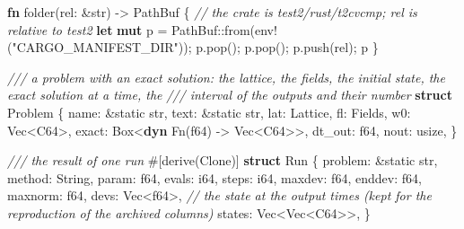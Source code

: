 \documentclass[
  10pt,
]{article}
\newenvironment{Shaded}{}{}
\newcommand{\AttributeTok}[1]{\textcolor[rgb]{0.49,0.56,0.16}{#1}}
\newcommand{\BuiltInTok}[1]{\textcolor[rgb]{0.00,0.50,0.00}{#1}}
\newcommand{\CommentTok}[1]{\textcolor[rgb]{0.38,0.63,0.69}{\textit{#1}}}
\newcommand{\DataTypeTok}[1]{\textcolor[rgb]{0.56,0.13,0.00}{#1}}
\newcommand{\KeywordTok}[1]{\textcolor[rgb]{0.00,0.44,0.13}{\textbf{#1}}}
\newcommand{\NormalTok}[1]{#1}
\newcommand{\OperatorTok}[1]{\textcolor[rgb]{0.40,0.40,0.40}{#1}}
\newcommand{\OtherTok}[1]{\textcolor[rgb]{0.00,0.44,0.13}{#1}}
\newcommand{\PreprocessorTok}[1]{\textcolor[rgb]{0.74,0.48,0.00}{#1}}
\newcommand{\StringTok}[1]{\textcolor[rgb]{0.25,0.44,0.63}{#1}}
\begin{document}
\begin{Shaded}
\begin{Highlighting}[]
\KeywordTok{fn}\NormalTok{ folder(rel}\OperatorTok{:} \OperatorTok{\&}\DataTypeTok{str}\NormalTok{) }\OperatorTok{{-}\textgreater{}} \DataTypeTok{PathBuf} \OperatorTok{\{}
    \CommentTok{// the crate is test2/rust/t2cvcmp; rel is relative to test2}
    \KeywordTok{let} \KeywordTok{mut}\NormalTok{ p }\OperatorTok{=} \DataTypeTok{PathBuf}\PreprocessorTok{::}\NormalTok{from(}\PreprocessorTok{env!}\NormalTok{(}\StringTok{"CARGO\_MANIFEST\_DIR"}\NormalTok{))}\OperatorTok{;}
\NormalTok{    p}\OperatorTok{.}\NormalTok{pop()}\OperatorTok{;}
\NormalTok{    p}\OperatorTok{.}\NormalTok{pop()}\OperatorTok{;}
\NormalTok{    p}\OperatorTok{.}\NormalTok{push(rel)}\OperatorTok{;}
\NormalTok{    p}
\OperatorTok{\}}

\CommentTok{/// a problem with an exact solution: the lattice, the fields, the initial state, the exact solution at a time, the}
\CommentTok{/// interval of the outputs and their number}
\KeywordTok{struct}\NormalTok{ Problem }\OperatorTok{\{}
\NormalTok{    name}\OperatorTok{:} \OperatorTok{\&}\OtherTok{\textquotesingle{}static} \DataTypeTok{str}\OperatorTok{,}
\NormalTok{    text}\OperatorTok{:} \OperatorTok{\&}\OtherTok{\textquotesingle{}static} \DataTypeTok{str}\OperatorTok{,}
\NormalTok{    lat}\OperatorTok{:}\NormalTok{ Lattice}\OperatorTok{,}
\NormalTok{    fl}\OperatorTok{:}\NormalTok{ Fields}\OperatorTok{,}
\NormalTok{    w0}\OperatorTok{:} \DataTypeTok{Vec}\OperatorTok{\textless{}}\NormalTok{C64}\OperatorTok{\textgreater{},}
\NormalTok{    exact}\OperatorTok{:} \DataTypeTok{Box}\OperatorTok{\textless{}}\KeywordTok{dyn} \BuiltInTok{Fn}\NormalTok{(}\DataTypeTok{f64}\NormalTok{) }\OperatorTok{{-}\textgreater{}} \DataTypeTok{Vec}\OperatorTok{\textless{}}\NormalTok{C64}\OperatorTok{\textgreater{}\textgreater{},}
\NormalTok{    dt\_out}\OperatorTok{:} \DataTypeTok{f64}\OperatorTok{,}
\NormalTok{    nout}\OperatorTok{:} \DataTypeTok{usize}\OperatorTok{,}
\OperatorTok{\}}

\CommentTok{/// the result of one run}
\AttributeTok{\#[}\NormalTok{derive}\AttributeTok{(}\BuiltInTok{Clone}\AttributeTok{)]}
\KeywordTok{struct}\NormalTok{ Run }\OperatorTok{\{}
\NormalTok{    problem}\OperatorTok{:} \OperatorTok{\&}\OtherTok{\textquotesingle{}static} \DataTypeTok{str}\OperatorTok{,}
\NormalTok{    method}\OperatorTok{:} \DataTypeTok{String}\OperatorTok{,}
\NormalTok{    param}\OperatorTok{:} \DataTypeTok{f64}\OperatorTok{,}
\NormalTok{    evals}\OperatorTok{:} \DataTypeTok{i64}\OperatorTok{,}
\NormalTok{    steps}\OperatorTok{:} \DataTypeTok{i64}\OperatorTok{,}
\NormalTok{    maxdev}\OperatorTok{:} \DataTypeTok{f64}\OperatorTok{,}
\NormalTok{    enddev}\OperatorTok{:} \DataTypeTok{f64}\OperatorTok{,}
\NormalTok{    maxnorm}\OperatorTok{:} \DataTypeTok{f64}\OperatorTok{,}
\NormalTok{    devs}\OperatorTok{:} \DataTypeTok{Vec}\OperatorTok{\textless{}}\DataTypeTok{f64}\OperatorTok{\textgreater{},}
    \CommentTok{// the state at the output times (kept for the reproduction of the archived columns)}
\NormalTok{    states}\OperatorTok{:} \DataTypeTok{Vec}\OperatorTok{\textless{}}\DataTypeTok{Vec}\OperatorTok{\textless{}}\NormalTok{C64}\OperatorTok{\textgreater{}\textgreater{},}
\OperatorTok{\}}


\end{Highlighting}
\end{Shaded}
\end{document}
